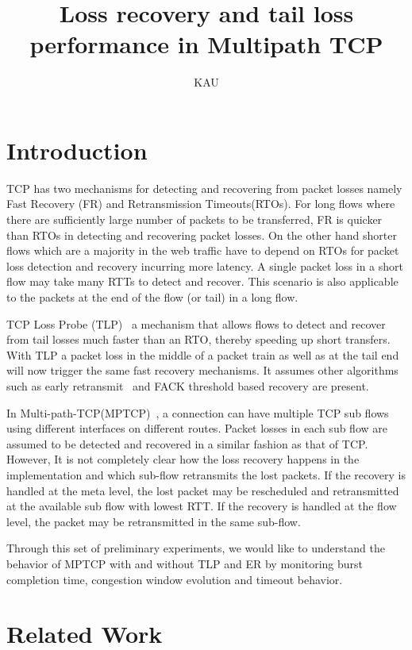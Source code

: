 \documentclass[12pt,draftcls,onecolumn]{IEEEtran}
\title{Loss recovery and tail loss performance in Multipath TCP}
\author{KAU}
\begin{document}
\maketitle

\begin{abstract}
\end{abstract}

\section{Introduction}
TCP has two mechanisms for detecting and recovering from packet losses namely Fast Recovery (FR) and Retransmission Timeouts(RTOs). For long flows where there are sufficiently large number of packets 
to be transferred, FR is quicker than RTOs in detecting and recovering packet losses. On the other hand shorter flows which are a majority in the web traffic have to depend on RTOs for packet loss detection 
and recovery incurring more latency. A single packet loss in a short flow may take many RTTs to detect and recover. This scenario is also applicable to the packets at the end of the flow (or tail) in a long 
flow.

TCP Loss Probe (TLP)~\cite{ietftlp} a mechanism that allows flows to detect and recover from tail losses much faster than an RTO, thereby speeding up short transfers. With TLP a packet loss in the middle 
of a packet train as well as at the tail end will now trigger the same fast recovery mechanisms. It assumes other algorithms such as early retransmit~\cite{rfc5827} and FACK threshold based recovery are 
present.

In Multi-path-TCP(MPTCP)~\cite{rfc6824}, a connection can have multiple TCP sub flows using different interfaces on different routes. Packet losses in each sub flow are assumed to be detected and recovered 
in a similar fashion as that of TCP. However, It is not completely clear how the loss recovery happens in the implementation and which sub-flow retransmits the lost packets. If the recovery is handled at the 
meta level, the lost packet may be rescheduled and retransmitted at the available sub flow with lowest RTT. If the recovery is handled at the flow level, the packet may be retransmitted in the same sub-flow. 

Through this set of preliminary experiments, we would like to understand the behavior of MPTCP with and without TLP and ER by monitoring burst completion time, congestion window evolution and timeout 
behavior.
\section{Related Work}\label{relwork}
\end{document}
